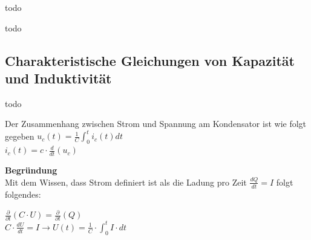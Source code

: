 \beginip
todo
\iend


\beginip
todo
\iend


\subsection{Charakteristische Gleichungen von Kapazität und Induktivität}
\begingl
todo
\iend

\begingl
Der Zusammenhang zwischen Strom und Spannung am Kondensator ist wie folgt gegeben
\formulaBegin
$\displaystyle u_c(t) = \frac{1}{C} \int_0^t i_c(t) dt$ \\

$\displaystyle i_c(t) = c \cdot \frac{d}{d t} (u_c)$ \\
\formulaEnd
\iend


\textbf{Begründung} \\
Mit dem Wissen, dass Strom definiert ist als die Ladung pro Zeit $ \displaystyle \frac{dQ}{dt} = I$ folgt folgendes: \\
\begin{center}
	$\displaystyle \frac{\partial}{\partial t} (C \cdot U) = \frac{\partial}{\partial t} (Q) $ \\
	$ \displaystyle C  \cdot \frac{dU}{dt} = I \rightarrow U(t) = \frac{1}{C} \cdot \int_0^t I \cdot dt$
\end{center}
